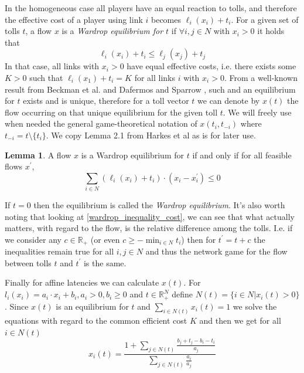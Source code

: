 \documentclass[10pt,a4paper]{book}
\newcommand{\R}{\mathbb{R}}
\theoremstyle{definition}
\newtheorem{lemma}[definition]{Lemma}
\theoremstyle{comment}
\begin{document}
In the homogeneous case all players have an equal reaction to tolls, and therefore the effective cost of a player using link $i$ becomes $\ell_i(x_i) + t_i$.
For a given set of tolls $t$, a flow $x$ is a \textit{Wardrop equilibrium for $t$} if $\forall i, j \in N$ with $x_i > 0$ it holds that
\begin{equation}
	\label{wardrop_inequality_cost}
	\ell_i(x_i) + t_i \leq \ell_j(x_j) + t_j
\end{equation}
In that case, all links with $x_i > 0$ have equal effective costs, i.e. there exists some $K > 0$ such that $\ell_i(x_1) + t_i = K$ for all links $i$ with $x_i > 0$.
From a well-known result from Beckman et al. \cite{beckmann1956studies} and Dafermos and Sparrow \cite{1363388843888284416}, such and an equilibrium for $t$ exists and is unique, therefore for a toll vector $t$ we can denote by $x(t)$ the flow occurring on  that unique equilibrium for the given toll $t$.
We will freely use when needed the general game-theoretical notation of $x(t_i, t_{-i})$ where $t_{-i} = t \setminus \{t_i\}$.
We copy Lemma 2.1 from Harkes et al \cite{Harks_2019} as is for later use.
\begin{lemma}
	\label{lemma:wardrop_equilibrium}
	A flow $x$ is a Wardrop equilibrium for $t$ if and only if for all feasible flows $x^\prime$,
	\[\sum_{i \in N} (\ell_i(x_i) + t_i) \cdot (x_i - x_i^\prime) \leq 0\]
\end{lemma}
If $t = 0$ then the equilibrium is called the \textit{Wardrop equilibrium}.
It's also worth noting that looking at \eqref{wardrop_inequality_cost}, we can see that what actually matters, with regard to the flow, is the relative difference among the tolls.
I.e. if we consider any $c \in \R_+$ (or even $c \geq -\min_{i \in N} t_i$) then for $t^\prime = t + c$ the inequalities remain true for all $i, j \in N$ and thus the network game for the flow between tolls $t$ and $t^\prime$ is the same.

Finally for affine latencies we can calculate $x(t)$.
For $l_i(x_i) = a_i \cdot x_i + b_i, a_i > 0, b_i \geq 0$ and $t \in \R_+^N$ define $N(t) = \{i \in N | x_i(t) > 0\}$.
Since $x(t)$ is an equilibrium for $t$ and $\sum_{i \in N(t)}x_i(t) = 1$ we solve the equations with regard to the common efficient cost $K$ and then we get for all $i \in N(t)$
\begin{equation}
	\label{eq:x_i}
	x_i(t) = \frac{1 + \sum_{j \in N(t)}\frac{b_j + t_j - b_i - t_i}{a_j}}{\sum_{j \in N(t)}\frac{a_i}{a_j}}
\end{equation}
\end{document}
